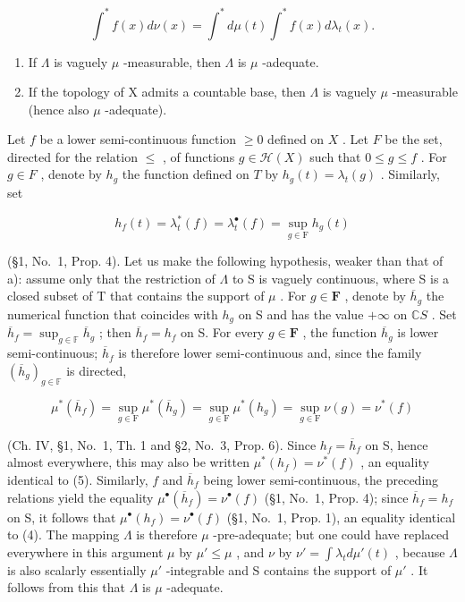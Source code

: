 \[
\int^ {*} f (x) d \nu (x) = \int^ {*} d \mu (t) \int^ {*} f (x) d \lambda_ {t} (x).\tag{5}
\]

\begin{enumerate}
\def\labelenumi{\alph{enumi})}
\setcounter{enumi}{1}
\item
  If \(\Lambda\) is vaguely \(\mu\) -measurable, then \(\Lambda\) is \(\mu\) -adequate.
\item
  If the topology of X admits a countable base, then \(\Lambda\) is vaguely \(\mu\) -measurable (hence also \(\mu\) -adequate).
\end{enumerate}

Let \(f\) be a lower semi-continuous function \(\geqslant 0\) defined on \(X\) . Let \(F\) be the set, directed for the relation \(\leqslant\) , of functions \(g \in \mathcal{H}(X)\) such that \(0 \leqslant g \leqslant f\) . For \(g \in F\) , denote by \(h_g\) the function defined on \(T\) by \(h_g(t) = \lambda_t(g)\) . Similarly, set

\[
h _ {f} (t) = \lambda_ {t} ^ {*} (f) = \lambda_ {t} ^ {\bullet} (f) = \sup _ {g \in \mathrm{F}} h _ {g} (t)
\]

(§1, No.~1, Prop. 4). Let us make the following hypothesis, weaker than that of a): assume only that the restriction of \(\Lambda\) to S is vaguely continuous, where S is a closed subset of T that contains the support of \(\mu\) . For \(g \in \mathbf{F}\) , denote by \(\overline{h}_g\) the numerical function that coincides with \(h_g\) on S and has the value \(+\infty\) on \(\mathbb{C}S\) . Set \(\overline{h}_f = \sup_{g \in \mathbb{F}} \overline{h}_g\) ; then \(\overline{h}_f = h_f\) on S. For every \(g \in \mathbf{F}\) , the function \(\overline{h}_g\) is lower semi-continuous; \(\overline{h}_f\) is therefore lower semi-continuous and, since the family \((\overline{h}_g)_{g \in \mathbb{F}}\) is directed,

\[
\mu^ {*} (\overline {{h}} _ {f}) = \sup _ {g \in \mathrm{F}} \mu^ {*} (\overline {{h}} _ {g}) = \sup _ {g \in \mathrm{F}} \mu^ {*} (h _ {g}) = \sup _ {g \in \mathrm{F}} \nu (g) = \nu^ {*} (f)
\]

(Ch. IV, §1, No.~1, Th. 1 and §2, No.~3, Prop. 6). Since \(h_f = \overline{h}_f\) on S, hence almost everywhere, this may also be written \(\mu^*(h_f) = \nu^*(f)\) , an equality identical to (5). Similarly, \(f\) and \(\overline{h}_f\) being lower semi-continuous, the preceding relations yield the equality \(\mu^\bullet(\overline{h}_f) = \nu^\bullet(f)\) (§1, No.~1, Prop. 4); since \(\overline{h}_f = h_f\) on S, it follows that \(\mu^\bullet(h_f) = \nu^\bullet(f)\) (§1, No.~1, Prop. 1), an equality identical to (4). The mapping \(\Lambda\) is therefore \(\mu\) -pre-adequate; but one could have replaced everywhere in this argument \(\mu\) by \(\mu' \leqslant \mu\) , and \(\nu\) by \(\nu' = \int \lambda_t d\mu'(t)\) , because \(\Lambda\) is also scalarly essentially \(\mu'\) -integrable and S contains the support of \(\mu'\) . It follows from this that \(\Lambda\) is \(\mu\) -adequate.

